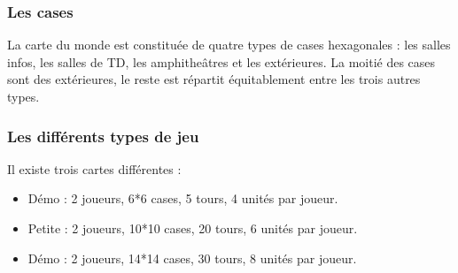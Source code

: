\subsubsection{Les cases}
La carte du monde est constituée de quatre types de cases hexagonales : les salles infos, les salles de TD, les amphitheâtres et les extérieures.
La moitié des cases sont des extérieures, le reste est répartit équitablement entre les trois autres types.

\subsubsection{Les différents types de jeu}
Il existe trois cartes différentes :
\begin{itemize}
\item Démo : 2 joueurs, 6*6 cases, 5 tours, 4 unités par joueur.
\item Petite : 2 joueurs, 10*10 cases, 20 tours, 6 unités par joueur.
\item Démo : 2 joueurs, 14*14 cases, 30 tours, 8 unités par joueur.
\end{itemize}